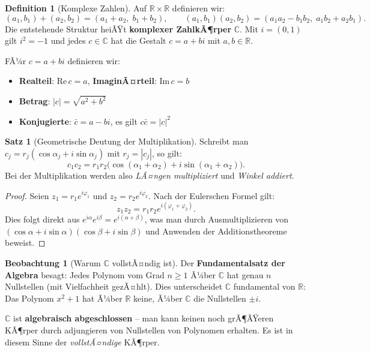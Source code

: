 ﻿\documentclass[a4paper,12pt]{report}
\theoremstyle{definition}
\newtheorem{definition}{Definition}
\newtheorem{satz}{Satz}
\newtheorem{beobachtung}{Beobachtung}
\begin{document}
\begin{definition}[Komplexe Zahlen]
    Auf $\mathbb{R} \times \mathbb{R}$ definieren wir:
    \[
        (a_1, b_1) + (a_2, b_2) = (a_1 + a_2,\; b_1 + b_2), \qquad
        (a_1, b_1)(a_2, b_2) = (a_1 a_2 - b_1 b_2,\; a_1 b_2 + a_2 b_1).
    \]
    Die entstehende Struktur heiÃŸt \textbf{komplexer ZahlkÃ¶rper} $\mathbb{C}$.
    Mit $i = (0, 1)$ gilt $i^2 = -1$ und jedes $c \in \mathbb{C}$ hat die
    Gestalt $c = a + bi$ mit $a, b \in \mathbb{R}$.

    FÃ¼r $c = a + bi$ definieren wir:
    \begin{itemize}
        \item[-] \textbf{Realteil}: $\mathrm{Re}\, c = a$, \quad \textbf{ImaginÃ¤rteil}: $\mathrm{Im}\, c = b$
        \item[-] \textbf{Betrag}: $|c| = \sqrt{a^2 + b^2}$
        \item[-] \textbf{Konjugierte}: $\bar{c} = a - bi$, \quad es gilt $c \bar{c} = |c|^2$
    \end{itemize}
\end{definition}

\begin{satz}[Geometrische Deutung der Multiplikation]
    Schreibt man $c_j = r_j(\cos \alpha_j + i \sin \alpha_j)$ mit $r_j = |c_j|$,
    so gilt:
    \[
        c_1 c_2 = r_1 r_2 \bigl(\cos(\alpha_1 + \alpha_2) + i \sin(\alpha_1 + \alpha_2)\bigr).
    \]
    Bei der Multiplikation werden also \emph{LÃ¤ngen multipliziert} und
    \emph{Winkel addiert}.
\end{satz}
\begin{proof}
    Seien $z_1 = r_1 e^{i\varphi_1}$ und $z_2 = r_2 e^{i\varphi_2}$.
    Nach der Eulerschen Formel gilt:
    \[
        z_1 z_2 = r_1 r_2 e^{i(\varphi_1 + \varphi_2)}.
    \]
    Dies folgt direkt aus $e^{i\alpha} e^{i\beta} = e^{i(\alpha+\beta)}$,
    was man durch Ausmultiplizieren von $(\cos\alpha + i\sin\alpha)(\cos\beta + i\sin\beta)$
    und Anwenden der Additionstheoreme beweist.
\end{proof}


\begin{beobachtung}[Warum \texorpdfstring{$\mathbb{C}$}{C} vollstÃ¤ndig ist]
    Der \textbf{Fundamentalsatz der Algebra} besagt: Jedes Polynom vom
    Grad $n \ge 1$ Ã¼ber $\mathbb{C}$ hat genau $n$ Nullstellen (mit
    Vielfachheit gezÃ¤hlt). Dies unterscheidet $\mathbb{C}$ fundamental von
    $\mathbb{R}$: Das Polynom $x^2 + 1$ hat Ã¼ber $\mathbb{R}$ keine, Ã¼ber
    $\mathbb{C}$ die Nullstellen $\pm i$.

    $\mathbb{C}$ ist \textbf{algebraisch abgeschlossen} -- man kann keinen
    noch grÃ¶ÃŸeren KÃ¶rper durch adjungieren von Nullstellen von Polynomen
    erhalten. Es ist in diesem Sinne der \emph{vollstÃ¤ndige} KÃ¶rper.
\end{beobachtung}
\end{document}

